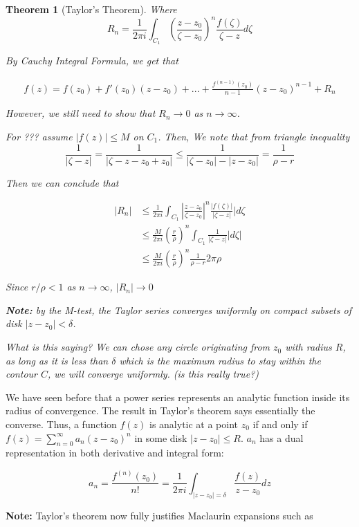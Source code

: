 \documentclass{article}
\newtheorem{theorem}{Theorem}[section]
\theoremstyle{definition}
\begin{document}
\begin{theorem}[Taylor's Theorem]
Where 
$$R_n = \frac{1}{2 \pi i } \int_{C_1} \left(\frac{z-z_0}{\zeta - z_0}\right)^n \frac{f(\zeta)}{\zeta - z}d\zeta$$

By Cauchy Integral Formula, we get that 

\begin{align*}
f(z) = f(z_0) + f'(z_0)(z-z_0) + ... + \frac{f^{(n-1)}(z_0)}{n-1}(z-z_0)^{n-1} + R_n
\end{align*}

However, we still need to show that $R_n \to 0$ as $n \to \infty$. 

For ??? assume $|f(z)| \leq M $ on $C_1$. Then,
We note that from triangle inequality $$\frac{1}{|\zeta-z|} = \frac{1}{|\zeta - z - z_0 + z_0|} \leq \frac{1}{|\zeta - z_0| - |z-z_0|} = \frac{1}{\rho - r}$$

Then we can conclude that

\begin{align*}
|R_n| &\leq \frac{1}{2 \pi i } \int_{C_1} \left|\frac{z-z_0}{\zeta - z_0}\right|^n \frac{|f(\zeta)|}{|\zeta - z|}|d\zeta \\ 
&\leq \frac{M}{2 \pi i } \left(\frac{r}{\rho}\right)^n \int_{C_1} \frac{1}{|\zeta-z|}|d\zeta| \\
&\leq \frac{M}{2 \pi i } \left(\frac{r}{\rho}\right)^n \frac{1}{\rho - r} 2 \pi \rho 
\end{align*}

Since $r/\rho < 1$ as $n \to \infty$, $|R_n| \to 0$

\textbf{Note:} by the M-test, the Taylor series converges uniformly on  compact subsets of disk $|z-z_0|<\delta$. 


What is this saying? We can chose any circle originating from $z_0$ with radius $R$, as long as it is less than $\delta$ which is the maximum radius to stay within the contour $C$, we will converge uniformly. (is this really true?)
\end{theorem}

We have seen before that a power series represents an analytic function inside its radius of convergence. The result in Taylor's theorem says essentially the converse. Thus, a function $f(z)$ is analytic at a point $z_0$ if and only if $f(z) = \sum_{n=0}^{\infty}a_n(z-z_0)^n$ in some disk $|z-z_0| \leq R$. $a_n$ has a dual representation in both derivative and integral form:

$$a_n  = \frac{f^(n)(z_0)}{n!} = \frac{1}{2 \pi i } \int_{|z-z_0|=\delta} \frac{f(z)}{z - z_0} dz$$


\textbf{Note:} Taylor's theorem now fully justifies Maclaurin expansions such as 
\end{document}
